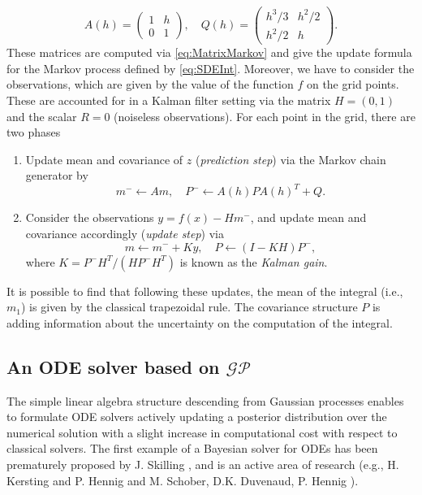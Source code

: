 \documentclass{scrartcl}
\theoremstyle{definition}
\theoremstyle{remark}
\numberwithin{definition}{section}
\numberwithin{remark}{section}
\newcommand{\GP}{\mathcal{GP}}
\begin{document}
\begin{equation}
	A(h) = \begin{pmatrix} 1 & h \\ 0 & 1\end{pmatrix}, \quad Q(h) = \begin{pmatrix} h^3/3 & h^2/2 \\ h^2/2 & h	\end{pmatrix}.
\end{equation}
These matrices are computed via \eqref{eq:MatrixMarkov} and give the update formula for the Markov process defined by \eqref{eq:SDEInt}. Moreover, we have to consider the observations, which are given by the value of the function $f$ on the grid points. These are accounted for in a Kalman filter setting \cite{Sar13} via the matrix $H = (0, 1)$ and the scalar $R = 0$ (noiseless observations). For each point in the grid, there are two phases
\begin{enumerate}
	\item Update mean and covariance of $z$ (\textit{prediction step}) via the Markov chain generator by 
	\begin{equation}
		m^{-} \leftarrow Am, \quad P^{-} \leftarrow A(h)PA(h)^T + Q.		
	\end{equation}
	\item Consider the observations $y = f(x) - Hm^{-}$, and update mean and covariance accordingly (\textit{update step}) via
	\begin{equation}
		m \leftarrow m^{-} + Ky, \quad P \leftarrow (I - KH)P^{-},
	\end{equation}
	where $K = P^{-}H^T/(HP^{-}H^T)$ is known as the \textit{Kalman gain}.
\end{enumerate}
It is possible to find that following these updates, the mean of the integral (i.e., $m_1$) is given by the classical trapezoidal rule. The covariance structure $P$ is adding information about the uncertainty on the computation of the integral.

\subsection{An ODE solver based on $\GP$}
The simple linear algebra structure descending from Gaussian processes enables to formulate ODE solvers actively updating a posterior distribution over the numerical solution with a slight increase in computational cost with respect to classical solvers. The first example of a Bayesian solver for ODEs has been prematurely proposed by J. Skilling \cite{Ski92}, and is an active area of research (e.g., H. Kersting and P. Hennig \cite{KeH16} and M. Schober, D.K. Duvenaud, P. Hennig \cite{SDH14}).
\end{document}
